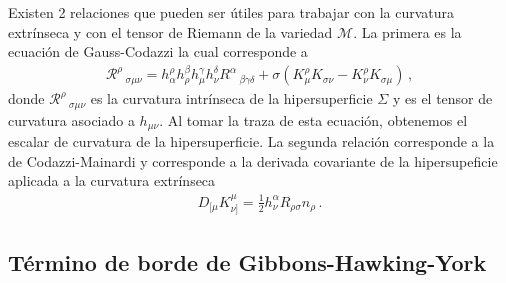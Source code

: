 \documentclass[../Main.tex]{subfiles}
\begin{document}
Existen 2 relaciones que pueden ser útiles para trabajar con la curvatura extrínseca  y con el tensor de Riemann de la variedad $\mathcal{M}$. La primera es la ecuación de Gauss-Codazzi la cual corresponde a 
\begin{align}
\mathcal{R}^{\rho}\,_{\sigma\mu\nu}=h^{\rho}_{\alpha}h^{\beta}_{\rho}h^{\gamma}_{\mu}h^{\delta}_{\nu}R^{\alpha}\,_{\beta\gamma\delta}+\sigma(K^{\rho}_{\mu}K_{\sigma\nu}-K^{\rho}_{\nu}K_{\sigma\mu})\, ,
\end{align}
donde $\mathcal{R}^{\rho}\,_{\sigma\mu\nu}$ es la curvatura intrínseca de la hipersuperficie $\Sigma$ y es el tensor de curvatura asociado a $h_{\mu\nu}$. Al tomar la traza de esta ecuación, obtenemos el escalar de curvatura de la hipersuperficie. La segunda relación corresponde a la de Codazzi-Mainardi y corresponde a la derivada covariante de la hipersupeficie aplicada a la curvatura extrínseca 
\begin{align}
    D_{[\mu}K_{\nu]}^{\mu}=\frac{1}{2}h^{\alpha}_{\nu}R_{\rho\sigma}n_{\rho}\, .
\end{align}



\subsection{Término de borde de Gibbons-Hawking-York}
\end{document}
